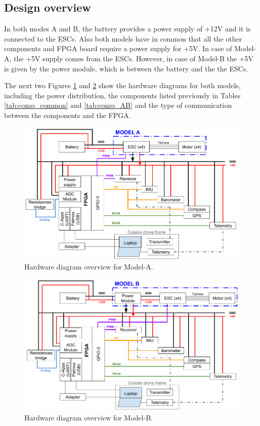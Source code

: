 \subsection{Design overview}
In both modes A and B, the battery provides a power supply of +12V and it is connected to the ESCs. Also both models have in common that all the other components and FPGA board require a power supply for +5V.
In case of Model-A, the +5V supply comes from the ESCs. However, in case of Model-B the +5V is given by the power module, which is between the battery and the the ESCs. 

The next two Figures \ref{fig:hw_modelA} and \ref{fig:hw_modelB} show the hardware diagrams for both models, including the power distribution, the components listed previously in Tables \ref{tab:comp_common} and \ref{tab:comp_AB} and the type of communication between the components and the FPGA.

\begin{figure}[!htb]
    \centering
    \includegraphics[scale=0.42]{Figures/hardware/Hardware_diagramA_ADC.png}
    \caption{Hardware diagram overview for Model-A.}
    \label{fig:hw_modelA}
\end{figure}

\begin{figure}[!htb]
    \centering
    \includegraphics[scale=0.42]{Figures/hardware/Hardware_diagramB_ADC.png}
    \caption{Hardware diagram overview for Model-B.}
    \label{fig:hw_modelB}
\end{figure}

